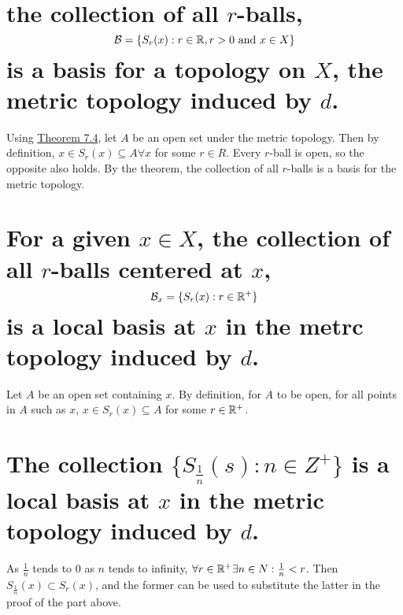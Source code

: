 
\begin{parts}
\part{the collection of all $r$-balls, $$\mathcal{B} = \{S_r(x):r\in\mathbb{R}, r > 0 \text{ and } x \in X\}$$ is a basis for a topology on $X$, the metric topology induced by $d$.}

\begin{solution}
Using \hyperref[thm4.7.4]{Theorem 7.4}, let $A$ be an open set under the metric topology. Then by definition, $x\in S_r(x) \subseteq A \forall x$ for some $r\in R$. Every $r$-ball is open, so the opposite also holds. By the theorem, the collection of all $r$-balls is a basis for the metric topology.
\end{solution}

\part{For a given $x\in X$, the collection of all $r$-balls centered at $x$, $$\mathcal{B}_x = \{S_r(x):r \in \mathbb{R}^+\}$$ is a local basis at $x$ in the metrc topology induced by $d$.}

\begin{solution}
Let $A$ be an open set containing $x$. By definition, for $A$  to be open, for all points in $A$ such as $x$, $x \in S_r(x) \subseteq A$ for some $r \in \mathbb{R}^+$.
\end{solution}

\part{The collection $\{S_{\frac{1}{n}}(s): n \in Z^+\}$ is a local basis at $x$ in the metric topology induced by $d$.}

\begin{solution}
As $\frac{1}{n}$ tends to 0 as $n$ tends to infinity, $\forall r \in \mathbb{R}^+ \exists n \in N: \frac{1}{n} < r$. Then $S_{\frac{1}{n}}(x) \subset S_r(x)$, and the former can be used to substitute the latter in the proof of the part above.
\end{solution}

\end{parts}


